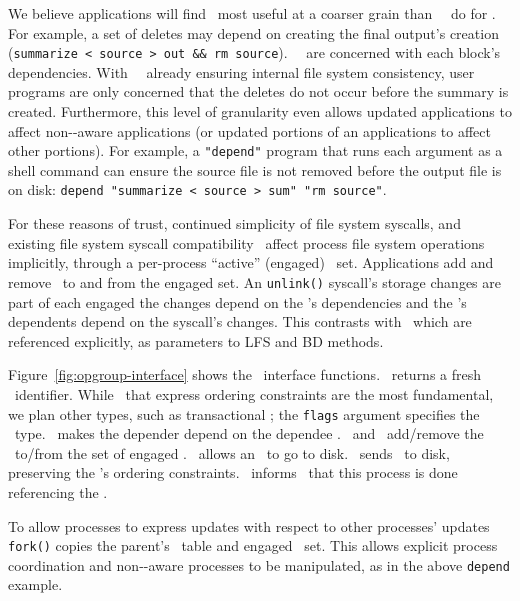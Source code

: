 We believe applications will find \opgroups\ most useful at a coarser
grain than \Kudos\ \modules\ do for \chdescs. For example, a set of
deletes may depend on creating the final output's creation
(\texttt{summarize < source > out \&\& rm source}). \Kudos\ \modules\
are concerned with each block's dependencies. With \Kudos\ \modules\
already ensuring internal file system consistency, user programs are
only concerned that the deletes do not occur before the summary is
created.
%
Furthermore, this level of granularity even allows updated
applications to affect non-\opgroup{}-aware applications (or updated
portions of an applications to affect other portions). For example, a
\texttt{"depend"} program that runs each argument as a shell command
can ensure the source file is not removed before the output file is on
disk: \texttt{depend "summarize < source > sum" "rm source"}.

For these reasons of trust, continued simplicity of file system
syscalls, and existing file system syscall compatibility \opgroups\
affect process file system operations implicitly, through a
per-process ``active'' (engaged) \opgroup\ set.  Applications add and
remove \opgroups\ to and from the engaged set. An \verb+unlink()+
syscall's storage changes are part of each engaged \opgroup\; the
changes depend on the \opgroup{}'s dependencies and the \opgroup{}'s
dependents depend on the syscall's changes. This contrasts with
\chdescs\ which are referenced explicitly, as parameters to LFS and BD
methods.

Figure~\ref{fig:opgroup-interface} shows the \opgroup\ interface functions.
\opgroupCreate\ returns a fresh \opgroup\ identifier. While
\opgroups\ that express ordering constraints are the most fundamental,
we plan other types, such as transactional \opgroups; the
\texttt{flags} argument specifies the \opgroup\ type.
\opgroupAddDepend\ makes the depender depend on the dependee \opgroup.
\opgroupEngage\ and \opgroupDisengage\ add/remove the \opgroup\ to/from
the set of engaged \opgroups. \opgroupRelease\ allows an \opgroup\ to go
to disk. \opgroupSync\ sends \anopgroup\ to disk, preserving
the \opgroup{}'s ordering constraints. \opgroupAbandon\ informs \Kudos\
that this process is done referencing the \opgroup.

To allow processes to express updates with respect to other processes'
updates \verb+fork()+ copies the parent's \opgroup\ table and engaged
\opgroup\ set. This allows explicit process coordination and
non-\opgroup{}-aware processes to be manipulated, as in the above
\texttt{depend} example.

